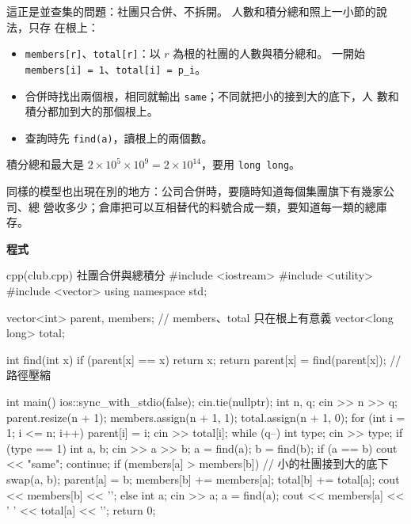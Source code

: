 這正是並查集的問題：社團只合併、不拆開。 人數和積分總和照上一小節的說法，只存
在根上：

\begin{itemize}
\item \texttt{members[r]}、\texttt{total[r]}：以 $r$ 為根的社團的人數與積分總和。
一開始 \texttt{members[i] = 1}、\texttt{total[i] = p\_i}。
\item 合併時找出兩個根，相同就輸出 \texttt{same}；不同就把小的接到大的底下，人
數和積分都加到大的那個根上。
\item 查詢時先 \texttt{find(a)}，讀根上的兩個數。
\end{itemize}

積分總和最大是 $2 \times 10^5 \times 10^9 = 2 \times 10^{14}$，要用
\texttt{long long}。

同樣的模型也出現在別的地方：公司合併時，要隨時知道每個集團旗下有幾家公司、總
營收多少；倉庫把可以互相替代的料號合成一類，要知道每一類的總庫存。

\textbf{程式}

\begin{example}[label=ex:club]{cpp}{(club.cpp) 社團合併與總積分}
#include <iostream>
#include <utility>
#include <vector>
using namespace std;

vector<int> parent, members;          // members、total 只在根上有意義
vector<long long> total;

int find(int x) {
    if (parent[x] == x) {
        return x;
    }
    return parent[x] = find(parent[x]);   // 路徑壓縮
}

int main() {
    ios::sync_with_stdio(false);
    cin.tie(nullptr);
    int n, q;
    cin >> n >> q;
    parent.resize(n + 1);
    members.assign(n + 1, 1);
    total.assign(n + 1, 0);
    for (int i = 1; i <= n; i++) {
        parent[i] = i;
        cin >> total[i];
    }
    while (q--) {
        int type;
        cin >> type;
        if (type == 1) {
            int a, b;
            cin >> a >> b;
            a = find(a);
            b = find(b);
            if (a == b) {
                cout << "same\n";
                continue;
            }
            if (members[a] > members[b]) {    // 小的社團接到大的底下
                swap(a, b);
            }
            parent[a] = b;
            members[b] += members[a];
            total[b] += total[a];
            cout << members[b] << '\n';
        } else {
            int a;
            cin >> a;
            a = find(a);
            cout << members[a] << ' ' << total[a] << '\n';
        }
    }
    return 0;
}
\end{example}

